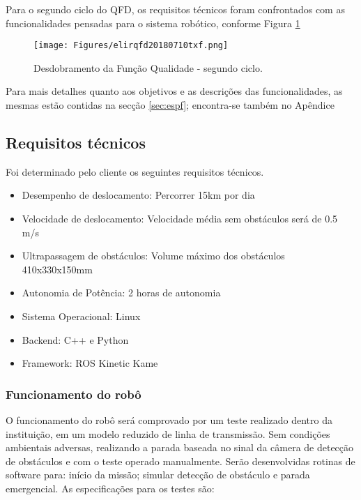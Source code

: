 
Para o segundo ciclo do QFD, os requisitos técnicos foram confrontados com as funcionalidades pensadas para o sistema robótico, conforme Figura \ref{fig_qfd2}

\begin{figure}[h!]
	\begin{center}
		\texttt{[image: Figures/elirqfd20180710txf.png]}
	\end{center}
	\caption{Desdobramento da Função Qualidade - segundo ciclo.}
	\label{fig_qfd2}
\end{figure}

Para mais detalhes quanto aos objetivos e as descrições das funcionalidades, as mesmas estão contidas na secção \ref{sec:espf}; encontra-se também no Apêndice

\subsection{Requisitos técnicos}
\label{ssec:reqt}
    Foi determinado pelo cliente os seguintes requisitos técnicos.
\begin{itemize}
	\item Desempenho de deslocamento: Percorrer 15km por dia
	\item Velocidade de deslocamento: Velocidade média sem obstáculos será de 0.5 m/s
	\item Ultrapassagem de obstáculos: Volume máximo dos obstáculos 410x330x150mm
	\item Autonomia de Potência: 2 horas de autonomia
	\item Sistema Operacional: Linux
	\item Backend: C++ e Python
	\item Framework: ROS Kinetic Kame
\end{itemize}

\subsubsection{Funcionamento do robô}
O funcionamento do robô será comprovado por um teste realizado dentro da instituição, em um modelo reduzido de linha de transmissão. Sem condições ambientais adversas, realizando a parada baseada no sinal da câmera de detecção de obstáculos e com o teste operado manualmente. Serão desenvolvidas rotinas de software para: início da missão; simular detecção de obstáculo e parada emergencial. As especificações para os testes são:

